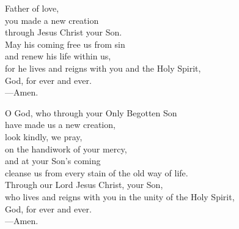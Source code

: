 \prayer


\begin{prayerverse}
Father of love,\\
you made a new creation\\
through Jesus Christ your Son.\\
May his coming free us from sin\\
and renew his life within us,\\
for he lives and reigns with you and the Holy Spirit,\\
God, for ever and ever.\\
{\color{red}---\thinspace}Amen.
\end{prayerverse}


\begin{prayerverse}
O God, who through your Only Begotten Son\\
have made us a new creation,\\
look kindly, we pray,\\
on the handiwork of your mercy,\\
and at your Son’s coming\\
cleanse us from every stain of the old way of life.\\
Through our Lord Jesus Christ, your Son,\\
 who lives and reigns with you in the unity of the Holy Spirit,\\
God, for ever and ever.\\
{\color{red}---\thinspace}Amen.
\end{prayerverse}

